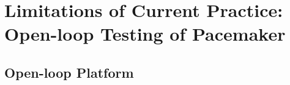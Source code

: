 \section{Limitations of Current Practice: Open-loop Testing of Pacemaker}
\label{openloop}
\subsection{Open-loop Platform}
